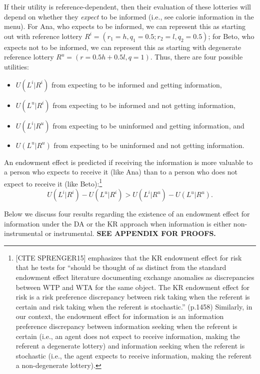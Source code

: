 \documentclass[12pt]{article}
\begin{document}
If their utility is reference-dependent, then their evaluation of these lotteries will depend on whether they \emph{expect} to be informed (i.e., see calorie information in the menu). For Ana, who expects to be informed, we can represent this as starting out with reference lottery $R^i=(r_1=h,q_1=0.5;r_2=l,q_2=0.5)$; for Beto, who expects not to be informed, we can represent this as starting with degenerate reference lottery $R^u=(r=0.5h+0.5l,q=1)$. Thus, there are four possible utilities:
\begin{itemize}
	\item $U(L^i|R^i)$ from expecting to be informed and getting information,
	\item $U(L^u|R^i)$ from expecting to be informed and not getting information,
	\item $U(L^i|R^u)$ from expecting to be uninformed and getting information, and
  \item $U(L^u|R^u)$ from expecting to be uninformed and not getting information.
\end{itemize}

An endowment effect is predicted if receiving the information is more valuable to a person who expects to receive it (like Ana) than to a person who does not expect to receive it (like Beto):\footnote{[CITE SPRENGER15] emphasizes that the KR endowment effect for risk that he tests for \enquote{should be thought of as distinct from the standard endowment effect literature documenting exchange anomalies as discrepancies between WTP and WTA for the same object. The KR endowment effect for risk is a risk preference discrepancy between risk taking when the referent is certain and risk taking when the referent is stochastic.} (p.1458) Similarly, in our context, the endowment effect for information is an information preference discrepancy between information seeking when the referent is certain (i.e., an agent does not expect to receive information, making the referent a degenerate lottery) and information seeking when the referent is stochastic (i.e., the agent expects to receive information, making the referent a non-degenerate lottery).}
\begin{equation}
  U(L^i|R^i)-U(L^u|R^i)>U(L^i|R^u)-U(L^u|R^u).
  \label{eq:endowmentEffect}
\end{equation}

Below we discuss four results regarding the existence of an endowment effect for information under the DA or the KR approach when information is either non-instrumental or instrumental. \textbf{SEE APPENDIX FOR PROOFS.}
\end{document}
